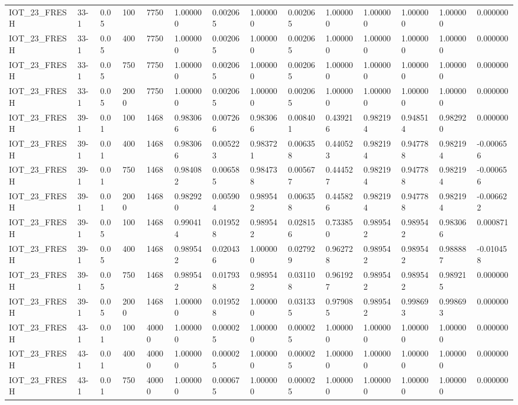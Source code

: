 \begin{tabular}{llllllllllllll}
IOT\_23\_FRESH & 33-1 & 0.05 & 100 & 7750 & 1.000000 & 0.002065 & 1.000000 & 0.002065 & 1.000000 & 1.000000 & 1.000000 & 1.000000 & 0.000000 \\
IOT\_23\_FRESH & 33-1 & 0.05 & 400 & 7750 & 1.000000 & 0.002065 & 1.000000 & 0.002065 & 1.000000 & 1.000000 & 1.000000 & 1.000000 & 0.000000 \\
IOT\_23\_FRESH & 33-1 & 0.05 & 750 & 7750 & 1.000000 & 0.002065 & 1.000000 & 0.002065 & 1.000000 & 1.000000 & 1.000000 & 1.000000 & 0.000000 \\
IOT\_23\_FRESH & 33-1 & 0.05 & 2000 & 7750 & 1.000000 & 0.002065 & 1.000000 & 0.002065 & 1.000000 & 1.000000 & 1.000000 & 1.000000 & 0.000000 \\
IOT\_23\_FRESH & 39-1 & 0.01 & 100 & 1468 & 0.983066 & 0.007266 & 0.983066 & 0.008401 & 0.439216 & 0.982194 & 0.948514 & 0.982920 & 0.000000 \\
IOT\_23\_FRESH & 39-1 & 0.01 & 400 & 1468 & 0.983066 & 0.005223 & 0.983721 & 0.006358 & 0.440523 & 0.982194 & 0.947788 & 0.982194 & -0.000656 \\
IOT\_23\_FRESH & 39-1 & 0.01 & 750 & 1468 & 0.984082 & 0.006585 & 0.984738 & 0.005677 & 0.444527 & 0.982194 & 0.947788 & 0.982194 & -0.000656 \\
IOT\_23\_FRESH & 39-1 & 0.01 & 2000 & 1468 & 0.982920 & 0.005904 & 0.989542 & 0.006358 & 0.445826 & 0.982194 & 0.947788 & 0.982194 & -0.006622 \\
IOT\_23\_FRESH & 39-1 & 0.05 & 100 & 1468 & 0.990414 & 0.019528 & 0.989542 & 0.028156 & 0.733850 & 0.989542 & 0.989542 & 0.983066 & 0.000871 \\
IOT\_23\_FRESH & 39-1 & 0.05 & 400 & 1468 & 0.989542 & 0.020436 & 1.000000 & 0.027929 & 0.962728 & 0.989542 & 0.989542 & 0.988887 & -0.010458 \\
IOT\_23\_FRESH & 39-1 & 0.05 & 750 & 1468 & 0.989542 & 0.017938 & 0.989542 & 0.031108 & 0.961927 & 0.989542 & 0.989542 & 0.989215 & 0.000000 \\
IOT\_23\_FRESH & 39-1 & 0.05 & 2000 & 1468 & 1.000000 & 0.019528 & 1.000000 & 0.031335 & 0.979085 & 0.989542 & 0.998693 & 0.998693 & 0.000000 \\
IOT\_23\_FRESH & 43-1 & 0.01 & 100 & 40000 & 1.000000 & 0.000025 & 1.000000 & 0.000025 & 1.000000 & 1.000000 & 1.000000 & 1.000000 & 0.000000 \\
IOT\_23\_FRESH & 43-1 & 0.01 & 400 & 40000 & 1.000000 & 0.000025 & 1.000000 & 0.000025 & 1.000000 & 1.000000 & 1.000000 & 1.000000 & 0.000000 \\
IOT\_23\_FRESH & 43-1 & 0.01 & 750 & 40000 & 1.000000 & 0.000675 & 1.000000 & 0.000025 & 1.000000 & 1.000000 & 1.000000 & 1.000000 & 0.000000 \\

\end{tabular}
